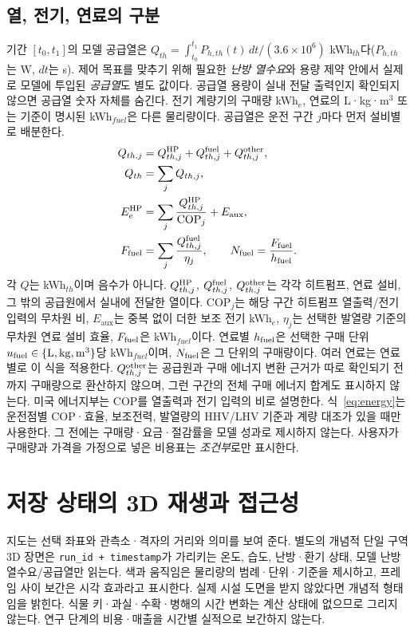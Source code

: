\documentclass[11pt,a4paper]{article}
\begin{document}
\subsection{열, 전기, 연료의 구분}
기간 $[t_0,t_1]$의 모델 공급열은 $Q_{th}=\int_{t_0}^{t_1}P_{h,th}(t)\,dt/(3.6\times10^6)$ kWh$_{th}$다($P_{h,th}$는 W, $dt$는 s). 제어 목표를 맞추기 위해 필요한 \emph{난방 열수요}와 용량 제약 안에서 실제로 모델에 투입된 \emph{공급열}도 별도 값이다. 공급열 용량이 실내 전달 출력인지 확인되지 않으면 공급열 숫자 자체를 숨긴다. 전기 계량기의 구매량 kWh$_e$, 연료의 L·kg·m$^3$ 또는 기준이 명시된 kWh$_{fuel}$은 다른 물리량이다. 공급열은 운전 구간 $j$마다 먼저 설비별로 배분한다.
\begin{align}
Q_{th,j}&=Q^{\rm HP}_{th,j}+Q^{\rm fuel}_{th,j}+Q^{\rm other}_{th,j},\notag\\
Q_{th}&=\sum_j Q_{th,j},\notag\\
E_e^{\rm HP}&=\sum_j\frac{Q^{\rm HP}_{th,j}}{\mathrm{COP}_j}+E_{\mathrm{aux}},\notag\\
F_{\rm fuel}&=\sum_j\frac{Q^{\rm fuel}_{th,j}}{\eta_j},
\qquad N_{\rm fuel}=\frac{F_{\rm fuel}}{h_{\rm fuel}}. \label{eq:energy}
\end{align}
각 $Q$는 kWh$_{th}$이며 음수가 아니다. $Q^{\rm HP}_{th,j}$, $Q^{\rm fuel}_{th,j}$, $Q^{\rm other}_{th,j}$는 각각 히트펌프, 연료 설비, 그 밖의 공급원에서 실내에 전달한 열이다. $\mathrm{COP}_j$는 해당 구간 히트펌프 열출력/전기입력의 무차원 비, $E_{\mathrm{aux}}$는 중복 없이 더한 보조 전기 kWh$_e$, $\eta_j$는 선택한 발열량 기준의 무차원 연료 설비 효율, $F_{\rm fuel}$은 kWh$_{fuel}$이다. 연료별 $h_{\rm fuel}$은 선택한 구매 단위 $u_{\rm fuel}\in\{\mathrm{L},\mathrm{kg},\mathrm{m^3}\}$당 kWh$_{fuel}$이며, $N_{\rm fuel}$은 그 단위의 구매량이다. 여러 연료는 연료별로 이 식을 적용한다. $Q^{\rm other}_{th,j}$는 공급원과 구매 에너지 변환 근거가 따로 확인되기 전까지 구매량으로 환산하지 않으며, 그런 구간의 전체 구매 에너지 합계도 표시하지 않는다. 미국 에너지부는 COP를 열출력과 전기 입력의 비로 설명한다\cite{doe-cop}. 식~\eqref{eq:energy}는 운전점별 COP·효율, 보조전력, 발열량의 HHV/LHV 기준과 계량 대조가 있을 때만 사용한다. 그 전에는 구매량·요금·절감률을 모델 성과로 제시하지 않는다. 사용자가 구매량과 가격을 가정으로 넣은 비용표는 \emph{조건부}로만 표시한다.

\section{저장 상태의 3D 재생과 접근성}
지도는 선택 좌표와 관측소·격자의 거리와 의미를 보여 준다. 별도의 개념적 단일 구역 3D 장면은 \texttt{run\_id + timestamp}가 가리키는 온도, 습도, 난방·환기 상태, 모델 난방 열수요/공급열만 읽는다. 색과 움직임은 물리량의 범례·단위·기준을 제시하고, 프레임 사이 보간은 시각 효과라고 표시한다. 실제 시설 도면을 받지 않았다면 개념적 형태임을 밝힌다. 식물 키·과실·수확·병해의 시간 변화는 계산 상태에 없으므로 그리지 않는다. 연구 단계의 비용·매출을 시간별 실적으로 보간하지 않는다.
\end{document}
